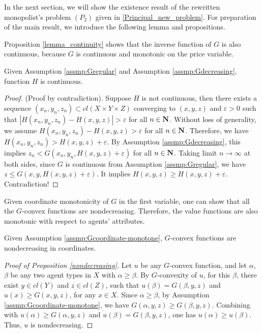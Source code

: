 \medskip
In the next section, we will show the existence result of the rewritten monopolist's problem $(P_2)$ given in \eqref{Principal_new_problem}. For preparation of the main result, we introduce the following lemma and propositions.\medskip

Proposition \ref{lemma_continuity} shows that the inverse function of $G$ is also continuous, because $G$ is continuous and monotonic on the price variable.\medskip

\begin{proposition}\label{lemma_continuity}
	Given Assumption \ref{assmp:Gregular} and Assumption \ref{assmp:Gdecreasing}, function $H$ is continuous.
\end{proposition}

\begin{proof}%
	(Proof by contradiction). Suppose $H$ is not continuous, then there exists a sequence ${(x_n, y_n, z_n)} \subset cl(X\times Y \times Z)$ converging to $(x, y, z)$ and $\varepsilon >0$ such that $|H(x_n, y_n, z_n) - H(x,y,z)|>\varepsilon$ for all $n\in \mathbf{N}$. Without loss of generality, we assume $H(x_n, y_n, z_n) - H(x,y,z)>\varepsilon$ for all $n\in \mathbf{N}$. Therefore, we have $H(x_n, y_n, z_n) > H(x,y,z)+\varepsilon$. By Assumption \ref{assmp:Gdecreasing}, this implies $z_n < G(x_n, y_n, H(x,y,z)+\varepsilon)$ for all $n\in \mathbf{N}$. Taking limit $n\rightarrow \infty$ at both sides, since $G$ is continuous from Assumption \ref{assmp:Gregular}, we have $z \le G(x, y, H(x,y,z)+\varepsilon)$. It implies $H(x,y,z) \ge H(x,y,z)+\varepsilon$. Contradiction!
\end{proof}

Given coordinate monotonicity of $G$ in the first variable, one can show that all the $G$-convex functions are nondecreasing. Therefore, the value functions are also monotonic with respect to agents' attributes.\medskip

\begin{proposition}\label{nondecreasing}
	Given Assumption \ref{assmp:Gcoordinate-monotone}, $G$-convex functions are nondecreasing in coordinates.
\end{proposition}

\begin{proof}[Proof of Proposition \ref{nondecreasing}]
	Let $u$ be any $G$-convex function, and let $\alpha$, $\beta$ be any two agent types in $X$ with $\alpha \ge \beta$. By $G$-convexity of $u$, for this $\beta$, there exist $y\in cl(Y)$ and $z \in cl(Z)$, such that $u(\beta)=G(\beta, y,z)$ and $u(x)\ge G(x, y,z)$, for any $x\in X$. Since $\alpha \ge \beta$, by Assumption \ref{assmp:Gcoordinate-monotone}, we have $G(\alpha, y,z)\ge G(\beta,y,z)$. Combining with $u(\alpha)\ge G(\alpha, y,z)$ and $u(\beta) = G(\beta,y,z)$, one has $u(\alpha) \ge u(\beta)$. Thus, $u$ is nondecreasing.
\end{proof}

